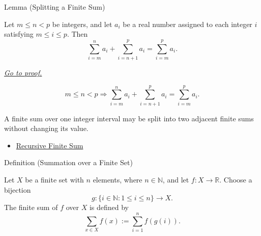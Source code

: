 \begin{lemmabox}{Lemma (Splitting a Finite Sum)}
\begin{lemma}
\label{lem:finite-sum-splitting}

Let \(m \le n < p\) be integers, and let \(a_i\) be a real number
assigned to each integer \(i\) satisfying \(m \le i \le p\). Then
\[
  \sum_{i=m}^{n} a_i
  +
  \sum_{i=n+1}^{p} a_i
  =
  \sum_{i=m}^{p} a_i.
\]

\smallskip
\noindent
\hyperref[prf:finite-sum-splitting]{\textit{Go to proof.}}
\end{lemma}
\end{lemmabox}

\begin{remark*}
\[
  m\le n<p
  \Longrightarrow
  \sum_{i=m}^{n}a_i+\sum_{i=n+1}^{p}a_i
  =
  \sum_{i=m}^{p}a_i.
\]
\end{remark*}

\begin{remark*}[Interpretation]
A finite sum over one integer interval may be split into two adjacent
finite sums without changing its value.
\end{remark*}

\begin{dependencies}
\begin{itemize}
  \item \hyperref[def:recursive-finite-sum]{Recursive Finite Sum}
\end{itemize}
\end{dependencies}

\begin{definitionbox}{Definition (Summation over a Finite Set)}
\begin{definition}
\label{def:summation-over-finite-set}

Let \(X\) be a finite set with \(n\) elements, where \(n \in \mathbb{N}\),
and let \(f:X\to\mathbb{R}\). Choose a bijection
\[
  g:\{i\in\mathbb{N}:1\le i\le n\}\to X.
\]
The finite sum of \(f\) over \(X\) is defined by
\[
  \sum_{x\in X} f(x)
  :=
  \sum_{i=1}^{n} f(g(i)).
\]
\end{definition}
\end{definitionbox}

